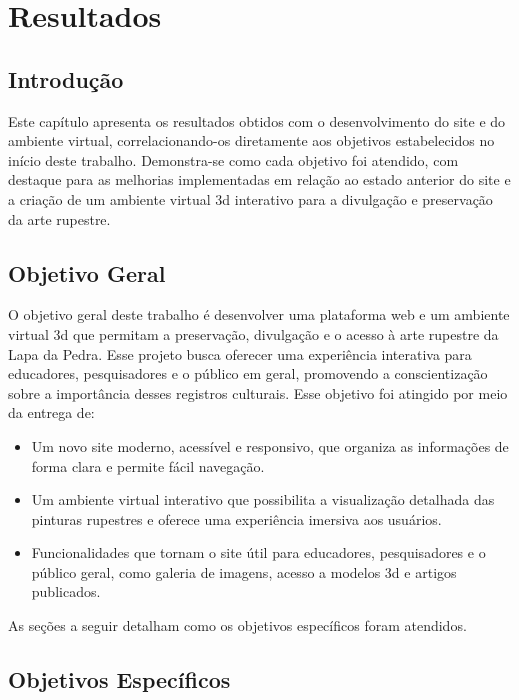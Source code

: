  \chapter{Resultados}
\label{cap:resultados}

\section{Introdução}
Este capítulo apresenta os resultados obtidos com o desenvolvimento do site e do ambiente virtual, correlacionando-os diretamente aos objetivos estabelecidos no início deste trabalho. Demonstra-se como cada objetivo foi atendido, com destaque para as melhorias implementadas em relação ao estado anterior do site e a criação de um ambiente virtual \gls{3d} interativo para a divulgação e preservação da arte rupestre.

\section{Objetivo Geral}
O objetivo geral deste trabalho é desenvolver uma plataforma web e um ambiente virtual \gls{3d} que permitam a preservação, divulgação e o acesso à arte rupestre da Lapa da Pedra. Esse projeto busca oferecer uma experiência interativa para educadores, pesquisadores e o público em geral, promovendo a conscientização sobre a importância desses registros culturais. Esse objetivo foi atingido por meio da entrega de:
\begin{itemize}
    \item Um novo site moderno, acessível e responsivo, que organiza as informações de forma clara e permite fácil navegação.
    \item Um ambiente virtual interativo que possibilita a visualização detalhada das pinturas rupestres e oferece uma experiência imersiva aos usuários.
    \item Funcionalidades que tornam o site útil para educadores, pesquisadores e o público geral, como galeria de imagens, acesso a modelos \gls{3d} e artigos publicados.
\end{itemize}

As seções a seguir detalham como os objetivos específicos foram atendidos.

\section{Objetivos Específicos}

